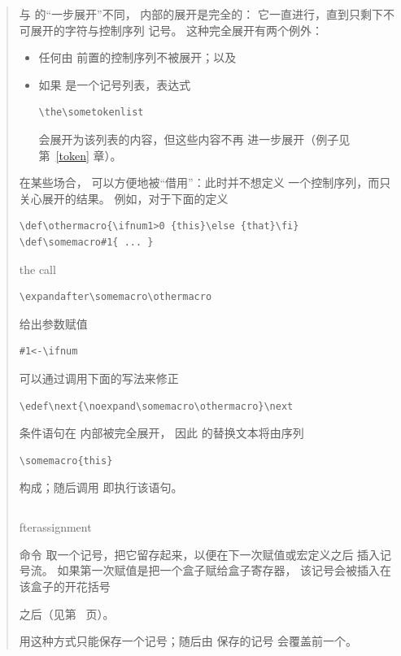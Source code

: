 \documentclass[a4paper]{rapport3}
\makeatletter
\def\alt{}\def\altt{}%
\newenvironment{disp}{\begin{quotation}}{\end{quotation}}
\def\cstoidx#1\par{\index{#1@\cs{#1}}}
\makeatother
\begin{document}
\begin{disp}
与  的“一步展开”不同， 内部的展开是完全的：
它一直进行，直到只剩下不可展开的字符与控制序列
记号。
这种完全展开有两个例外：
\begin{itemize} \item 任何由  前置的控制序列不被展开；以及
\item 如果  是一个记号列表，表达式
\begin{verbatim}
\the\sometokenlist 
\end{verbatim}
会展开为该列表的内容，但这些内容不再
进一步展开（例子见第~\ref{token} 章）。\end{itemize}

在某些场合， 可以方便地被“借用”：此时并不想定义
一个控制序列，而只关心展开的结果。
例如，对于下面的定义
\alt
\begin{verbatim}
\def\othermacro{\ifnum1>0 {this}\else {that}\fi}
\def\somemacro#1{ ... }
\end{verbatim}
the call\begin{verbatim}
\expandafter\somemacro\othermacro 
\end{verbatim}
给出参数赋值
\begin{verbatim}
#1<-\ifnum
\end{verbatim}
可以通过调用下面的写法来修正
\begin{verbatim}
\edef\next{\noexpand\somemacro\othermacro}\next
\end{verbatim}
条件语句在  内部被完全展开，
因此  的替换文本将由序列
\begin{verbatim}
\somemacro{this}
\end{verbatim} 
构成；随后调用  即执行该语句。


\subsection{\protect{}}
\label{sec:afterassignment}

\cstoidx afterassignment\par 命令
取一个记号，把它留存起来，以便在下一次赋值或宏定义之后
插入记号流。
如果第一次赋值是把一个盒子赋给盒子寄存器，
该记号会被插入在该盒子的开花括号
\alt
之后（见第~\pageref{every:box:assign} 页）。

用这种方式只能保存一个记号；随后由  保存的记号
会覆盖前一个。


\end{disp}
\end{document}
